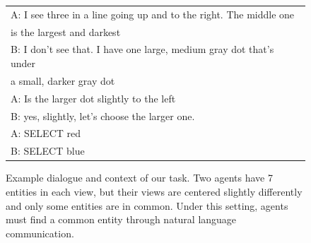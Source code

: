 \documentclass[letterpaper]{article}
\begin{document}
\begin{figure}[ht]
\small
\begin{tabular}{@{}l@{}}
\toprule
A: I see three in a line going up and to the right. The middle one \\
is the largest and darkest \\
B: I don't see that. I have one large, medium gray dot that's under \\
a small, darker gray dot \\
A: Is the larger dot slightly to the left \\
B: yes, slightly, let's choose the larger one. \\
A: SELECT {\color{red} red} \\
B: SELECT {\color{blue} blue} \\
\bottomrule
\end{tabular}
\caption{Example dialogue and context of our task. Two agents have 7 entities in each view, but their views are centered slightly differently and only some entities are in common. Under this setting, agents must find a common entity through natural language communication.
}
\label{fig:example}
\end{figure}
\end{document}
